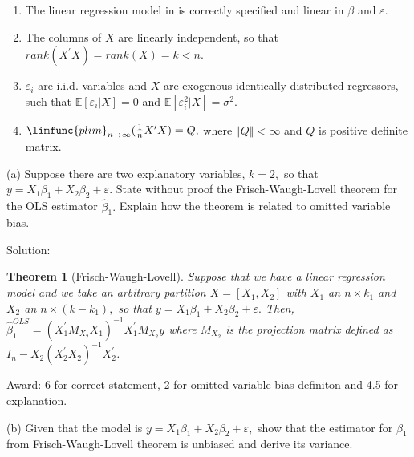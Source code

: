 \documentclass{article}
\newtheorem{theorem}{Theorem}
\begin{document}
\begin{enumerate}
\item The linear regression model in is correctly specified and linear in $%
\beta $ and $\varepsilon .$

\item The columns of $X$ are linearly independent, so that $rank(X^{\prime
}X)=rank(X)=k<n.$

\item $\varepsilon _{i}$ are i.i.d. variables and $X$ are exogenous
identically distributed regressors, such that $\mathbb{E}[\varepsilon
_{i}|X]=0$ and $\mathbb{E}[\varepsilon _{i}^{2}|X]=\sigma ^{2}.$

\item $\limfunc{plim}_{n\rightarrow \infty }(\frac{1}{n}X^{\prime }X)=Q,$
where $\left\Vert Q\right\Vert <\infty $ and $Q$ is positive definite matrix.
\end{enumerate}

(a) Suppose there are two explanatory variables, $k=2,$ so that $%
y=X_{1}\beta _{1}+X_{2}\beta _{2}+\varepsilon .$ State without proof the
Frisch-Waugh-Lovell theorem for the OLS estimator $\hat{\beta}_{1}.$ Explain
how the theorem is related to omitted variable bias.

Solution:

\begin{theorem}[Frisch-Waugh-Lovell]
Suppose that we have a linear regression model and we take an arbitrary
partition $X=[X_{1},X_{2}]$ with $X_{1}$ an $n\times k_{1}$ and $X_{2}$ an $%
n\times \left( k-k_{1}\right) ,$ so that $y=X_{1}\beta _{1}+X_{2}\beta
_{2}+\varepsilon .$ Then, $\widehat{\beta }_{1}^{OLS}=(X_{1}^{\prime
}M_{X_{2}}X_{1})^{-1}X_{1}^{\prime }M_{X_{2}}y$ where $M_{X_{2}}$ is the
projection matrix defined as $I_{n}-X_{2}(X_{2}^{\prime
}X_{2})^{-1}X_{2}^{\prime }$.
\end{theorem}

Award: 6 for correct statement, 2 for omitted variable bias definiton and
4.5 for explanation.

(b) Given that the model is $y=X_{1}\beta _{1}+X_{2}\beta _{2}+\varepsilon ,$
show that the estimator for $\beta _{1}$ from Frisch-Waugh-Lovell theorem is
unbiased and derive its variance.
\end{document}
